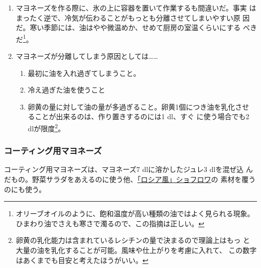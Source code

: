 \begin{recette}
\begin{enumerate}
\def\labelenumi{\arabic{enumi}.}
\setcounter{enumi}{1}
\item
  マヨネーズを作る際に、氷の上に容器を置いて作業するも間違いだ。事実
  はまったく逆で、冷気が伝わることがもっとも分離させてしまいやすい原
  因だ。寒い季節には、油はやや微温めか、せめて厨房の室温くらいにする
  べきだ\footnote{オリーブオイルのように、飽和温度が高い種類の油ではよく見られる現象。ひまわり油でさえも寒さで濁るので、この指摘は正しい。}。
\item
  マヨネーズが分離してしまう原因としては\ldots{}\ldots{}

  \begin{enumerate}
  \def\labelenumii{\arabic{enumii}.}
  \tightlist
  \item
    最初に油を入れ過ぎてしまうこと。
  \item
    冷え過ぎた油を使うこと
  \item
    卵黄の量に対して油の量が多過ぎること。卵黄1個につき油を乳化させ
    ることが出来るのは、作り置きするのには1\troisquarts{} dl、すぐ
    に使う場合でも2 dlが限度\footnote{卵黄の乳化能力は含まれているレシチンの量で決まるので理論上はもっ
      と大量の油を乳化することが可能。風味や仕上がりを考慮に入れて、
      この数字はあくまでも目安と考えたほうがいい。}。
  \end{enumerate}
\end{enumerate}

\maeaki

\hypertarget{mayonnaise-collee}{%
\subsubsection{コーティング用マヨネーズ}\label{mayonnaise-collee}}



コーティング用マヨネーズは、マヨネーズ7 dlに溶かしたジュレ3 dlを混ぜ込
んだもの。野菜サラダをあえるのに使う他、\protect\hyperlink{}{「ロシア風」ショフロワ}の
素材を覆うのにも使う。


\end{recette}
